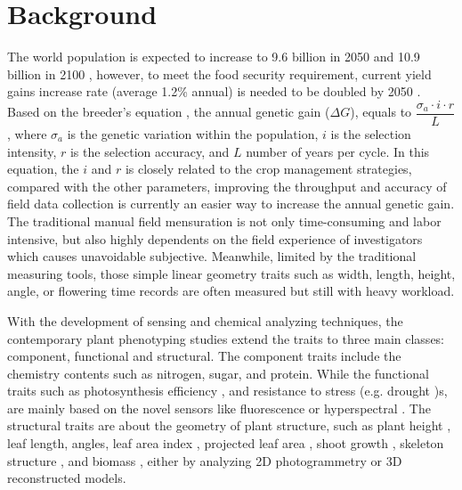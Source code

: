 \documentclass{configs/bmcart}
\begin{document}
\section*{Background}
The world population is expected to increase to 9.6 billion in 2050 and 10.9 billion in 2100 \cite{gerland_world_2014}, however, to meet the food security requirement, current yield gains increase rate (average 1.2\% annual) is needed to be doubled by 2050 \cite{ray_yield_2013}. Based on the breeder's equation \cite{eberhart_factors_1970, cobb_enhancing_2019}, the annual genetic gain ($\Delta G$), equals to $\dfrac{\sigma_{a} \cdot i \cdot r}{L}$, where $\sigma_a$ is the genetic variation within the population, $i$ is the selection intensity, $r$ is the selection accuracy, and $L$ number of years per cycle. In this equation, the $i$ and $r$ is closely related to the crop management strategies, compared with the other parameters, improving the throughput and accuracy of field data collection is currently an easier way to increase the annual genetic gain. The traditional manual field mensuration is not only time-consuming and labor intensive, but also highly dependents on the field experience of investigators which causes unavoidable subjective. Meanwhile, limited by the traditional measuring tools, those simple linear geometry traits such as width, length, height, angle, or flowering time records are often measured but still with heavy workload.

With the development of sensing and chemical analyzing techniques, the contemporary plant phenotyping studies extend the traits to three main classes: component, functional and structural. The component traits include the chemistry contents such as nitrogen, sugar, and protein. While the functional traits such as photosynthesis efficiency \cite{song_optimal_2013}, and resistance to stress (e.g. drought \cite{araus_phenotyping_2012, xiang_robotic_2020})s, are mainly based on the novel sensors like fluorescence \cite{krause_chlorophyll_1991} or hyperspectral \cite{yendrek_high-throughput_2017}. The structural traits are about the geometry of plant structure, such as plant height \cite{ten_biomass_2019}, leaf length, angles, leaf area index \cite{zermas_3d_2020}, projected leaf area \cite{guo_easypcc:_2017}, shoot growth \cite{li_measuring_2020}, skeleton structure \cite{wu_accurate_2019}, and biomass \cite{ten_biomass_2019, jin_non-destructive_2020}, either by analyzing 2D photogrammetry or 3D reconstructed models.
\end{document}

